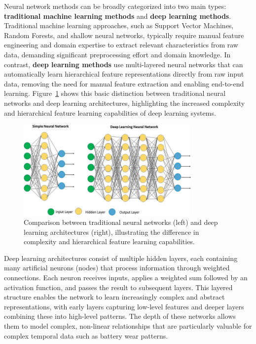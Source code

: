 Neural network methods can be broadly categorized into two main types: \textbf{traditional machine learning methods} and \textbf{deep learning methods}. Traditional machine learning approaches, such as Support Vector Machines, Random Forests, and shallow neural networks, typically require manual feature engineering and domain expertise to extract relevant characteristics from raw data, demanding significant preprocessing effort and domain knowledge. In contrast, \textbf{deep learning methods} use multi-layered neural networks that can automatically learn hierarchical feature representations directly from raw input data, removing the need for manual feature extraction and enabling end-to-end learning. Figure~\ref{fig:neural_vs_deep} shows this basic distinction between traditional neural networks and deep learning architectures, highlighting the increased complexity and hierarchical feature learning capabilities of deep learning systems.

\begin{figure}[htbp]
\centering
\includegraphics[width=0.8\textwidth]{imgs/neural_vs_deep.png}
\caption{Comparison between traditional neural networks (left) and deep learning architectures (right), illustrating the difference in complexity and hierarchical feature learning capabilities.}
\label{fig:neural_vs_deep}
\end{figure}

Deep learning architectures consist of multiple hidden layers, each containing many artificial neurons (nodes) that process information through weighted connections. Each neuron receives inputs, applies a weighted sum followed by an activation function, and passes the result to subsequent layers. This layered structure enables the network to learn increasingly complex and abstract representations, with early layers capturing low-level features and deeper layers combining these into high-level patterns. The depth of these networks allows them to model complex, non-linear relationships that are particularly valuable for complex temporal data such as battery wear patterns.

